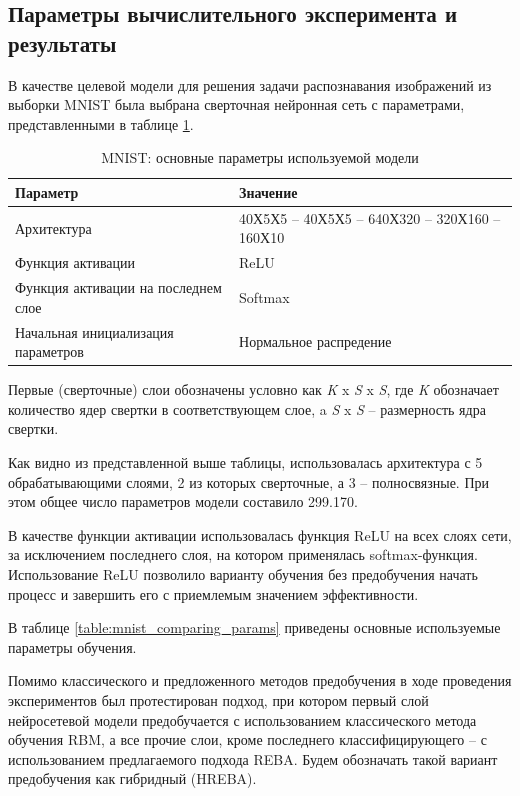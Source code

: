 \subsection{Параметры вычислительного эксперимента и результаты}

В качестве целевой модели для решения задачи распознавания изображений из выборки MNIST была выбрана сверточная нейронная сеть с параметрами, представленными в таблице \ref{table:mnist_conv_model}.

\begin{table} [!h]
  \caption{MNIST: основные параметры используемой модели}\label{table:mnist_conv_model}
\centering
\begin{tabular}{| p{7cm} | p{8cm} |}
  \hline
    \textbf{Параметр} & \textbf{Значение}\\
    \hline
    Архитектура & 40Х5Х5 -- 40Х5Х5 -- 640Х320 -- 320Х160 -- 160Х10\\
    \hline
    Функция активации & ReLU \\
    \hline
    Функция активации на последнем слое & Softmax \\
    Начальная инициализация параметров & Нормальное распредение \\
    \hline
\end{tabular}
\end{table}

Первые (сверточные) слои обозначены условно как \textit{K} x \textit{S} x \textit{S}, где \textit{K} обозначает количество ядер свертки в соответствующем слое, a \textit{S} x \textit{S} -- размерность ядра свертки.

Как видно из представленной выше таблицы, использовалась архитектура с 5 обрабатывающими слоями, 2 из которых сверточные, а 3 -- полносвязные. При этом общее число параметров модели составило 299.170.

В качестве функции активации использовалась функция ReLU на всех слоях сети, за исключением последнего слоя, на котором применялась softmax-функция. Использование ReLU позволило варианту обучения без предобучения начать процесс и завершить его с приемлемым значением эффективности.

В таблице \ref{table:mnist_comparing_params} приведены основные используемые параметры обучения.

Помимо классического и предложенного методов предобучения в ходе проведения экспериментов был протестирован подход, при котором первый слой нейросетевой модели предобучается с использованием классического метода обучения RBM, а все прочие слои, кроме последнего классифицирующего -- с использованием предлагаемого подхода REBA. Будем обозначать такой вариант предобучения как гибридный (HREBA).

